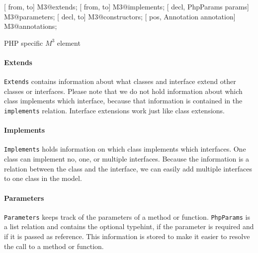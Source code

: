 \documentclass[../main.tex]{subfiles}
\begin{document}
    \begin{program}    
    \begin{rascal}%
 [ from,  to] M3@extends;    
 [ from,  to] M3@implements; 
 [ decl, PhpParams params] M3@parameters; 
 [ decl,  to] M3@constructors; 
 [ pos, Annotation annotation] M3@annotations; \end{rascal}%
	
	\caption{PHP specific $M^3$ element}
	\label{fig:m3_php_elements}
	\end{program}
	    
	\paragraph{Extends} \texttt{Extends} contains information about what classes and interface extend other classes or interfaces.
	Please note that we do not hold information about which class implements which interface, because that information is contained in the \texttt{implements} relation.
    Interface extensions work just like class extensions.
    
    \paragraph{Implements} \texttt{Implements} holds information on which class implements which interfaces.
    One class can implement no, one, or multiple interfaces.
    Because the information is a relation between the class and the interface, we can easily add multiple interfaces to one class in the model.
    
    \paragraph{Parameters} \texttt{Parameters} keeps track of the parameters of a method or function.
    \texttt{PhpParams} is a list relation and contains the optional typehint, if the parameter is required and if it is passed as reference.
    This information is stored to make it easier to resolve the call to a method or function.
    
\end{document}
